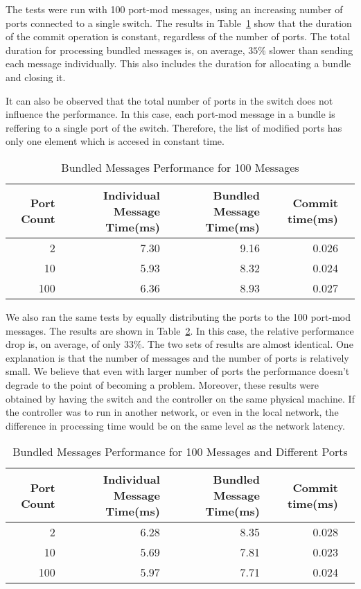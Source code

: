 The tests were run with 100 port-mod messages, using an increasing number of ports connected to a single
switch. The results in Table~\ref{tbl:bundleperf} show that the duration of the commit operation is constant,
regardless of the number of ports. The total duration for processing bundled messages is, on average,
$35\%$ slower than sending each message individually. This also includes the duration for allocating
a bundle and closing it.

It can also be observed that the total number of ports in the switch does not influence the performance.
In this case, each port-mod message in a bundle is reffering to a single port of the switch. Therefore, the
list of modified ports has only one element which is accesed in constant time.

\begin{table}[h]
  \centering
  \begin{tabular}{rrrrr}
    \toprule
      Port Count & Individual Message Time(ms) & Bundled Message Time(ms) & Commit time(ms) \\ 
    \midrule
        2 & 7.30 & 9.16 & 0.026 \\
       10 & 5.93 & 8.32 & 0.024 \\
       100 & 6.36 & 8.93 & 0.027 \\
    \bottomrule
  \end{tabular}
  \caption{Bundled Messages Performance for 100 Messages}
    \label{tbl:bundleperf}
\end{table}

We also ran the same tests by equally distributing the ports to the 100 port-mod messages. The results
are shown in Table~\ref{tbl:bundleperf2}. In this case, the relative performance drop is, on average, of only $33\%$.
The two sets of results are almost identical. One explanation is that the number of messages and the number of
ports is relatively small. We believe that even with larger number of ports the performance doesn't degrade
to the point of becoming a problem. Moreover, these results were obtained by having the switch and the controller
on the same physical machine. If the controller was to run in another network, or even in the local network,
the difference in processing time would be on the same level as the network latency.

\begin{table}[h]
  \centering
  \begin{tabular}{rrrrr}
    \toprule
      Port Count & Individual Message Time(ms) & Bundled Message Time(ms) & Commit time(ms) \\ 
    \midrule
        2 & 6.28 & 8.35 & 0.028 \\
       10 & 5.69 & 7.81 & 0.023 \\
       100 & 5.97 & 7.71 & 0.024 \\
    \bottomrule
  \end{tabular}
  \caption{Bundled Messages Performance for 100 Messages and Different Ports}
    \label{tbl:bundleperf2}
\end{table}

